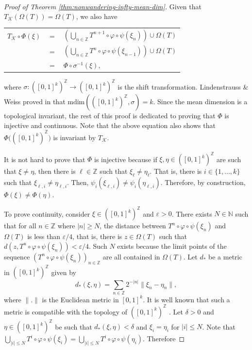 \documentclass[sn-mathphys-num]{sn-jnl}%
\theoremstyle{thmstyleone}%
\theoremstyle{thmstyletwo}%
\theoremstyle{thmstylethree}%
\newcommand{\abs}[1]{\lvert#1\rvert}
\newcommand*\induce[1]{#1_\mathcal{K}}
\begin{document}
\begin{proof}[Proof of Theorem \emph{\ref{thm:nonwandering-infty-mean-dim}}]
    Given that $\induce{T}(\Omega(T)) = \Omega(T)$, we also have

    \begin{center}
    \begin{tabular}{ c c l }
     $\induce{T}\circ\Phi(\xi)$ & $=$ & $\left(\bigcup\limits_{n \in \mathbb{Z}} T^{n + 1}\circ\varphi\circ\psi(\xi_n)\right) \cup \Omega(T)$ \\ 
      & $=$ & $\left(\bigcup\limits_{n \in \mathbb{Z}} T^n\circ\varphi\circ\psi(\xi_{n - 1})\right) \cup \Omega(T)$ \\  
      & $=$ & $\Phi\circ\sigma^{-1}(\xi),$    
    \end{tabular}
    \end{center}   
    where $\sigma: ([0, 1]^k)^\mathbb{Z} \to ([0, 1]^k)^\mathbb{Z}$ is the shift transformation. Lindenstrauss \& Weiss proved in \cite{lindenstrauss_weiss_2000} that $\text{mdim}(([0, 1]^k)^\mathbb{Z}, \sigma) = k$. Since the mean dimension is a topological invariant, the rest of this proof is dedicated to proving that $\Phi$ is injective and continuous. Note that the above equation also shows that $\Phi\big(([0, 1]^k)^\mathbb{Z}\big)$ is invariant by $\induce{T}$.

    It is not hard to prove that $\Phi$ is injective because if $\xi, \eta \in ([0, 1]^k)^\mathbb{Z}$ are such that $\xi \neq \eta$, then there is $\ell \in \mathbb{Z}$ such that $\xi_\ell \neq \eta_\ell$. That is, there is $i \in \{1, ..., k\}$ such that $\xi_{\ell, i} \neq \eta_{\ell, i}$. Then, $\psi_i(\xi_{\ell, i}) \neq \psi_i(\eta_{\ell, i})$. Therefore, by construction, $\Phi(\xi) \neq \Phi(\eta)$.

    To prove continuity, consider $\xi \in ([0, 1]^k)^\mathbb{Z}$ and $\varepsilon > 0$. There exists $N \in \mathbb{N}$ such that for all $n \in \mathbb{Z}$ where $\abs{n} \geq N$, the distance between $T^n\circ\varphi\circ\psi(\xi_n)$ and $\Omega(T)$ is less than $\varepsilon/4$, that is, there is $z \in \Omega(T)$ such that $d(z, T^n\circ\varphi\circ\psi(\xi_n)) < \varepsilon/4$. Such $N$ exists because the limit points of the sequence $(T^n\circ\varphi\circ\psi(\xi_n))_{n \in \mathbb{Z}}$ are all contained in $\Omega(T)$. Let $d_*$ be a metric in $([0, 1]^k)^\mathbb{Z}$ given by 
    \begin{equation*}
        d_*(\xi, \eta) = \sum\limits_{n \in \mathbb{Z}} 2^{-\abs{n}}\lVert\xi_n - \eta_n\rVert,
    \end{equation*}
    where $\lVert.\rVert$ is the Euclidean metric in $[0, 1]^k$. It is well known that such a metric is compatible with the topology of $([0, 1]^k)^\mathbb{Z}$ \cite{vanMill_1989}. Let $\delta > 0$ and $\eta \in ([0, 1]^k)^\mathbb{Z}$ be such that $d_*(\xi, \eta) < \delta$ and $\xi_i = \eta_i$ for $\abs{i} \leq N$. Note that $\bigcup\limits_{\abs{i} \leq N} T^i\circ\varphi\circ\psi(\xi_i) = \bigcup\limits_{\abs{i} \leq N} T^i\circ\varphi\circ\psi(\eta_i)$. Therefore 


\end{proof}
\end{document}
